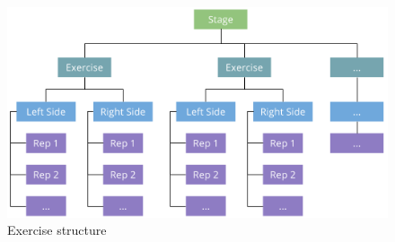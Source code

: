 \begin{figure}[htb]
	\centering
	\begin{minipage}[t]{1\linewidth}
		\centering
		\includegraphics[width=1\linewidth]{Pictures/exerciseStructureTopDown2}
		\caption{Exercise structure}
		\label{fig:exerciseStructure}
	\end{minipage}
\end{figure}

